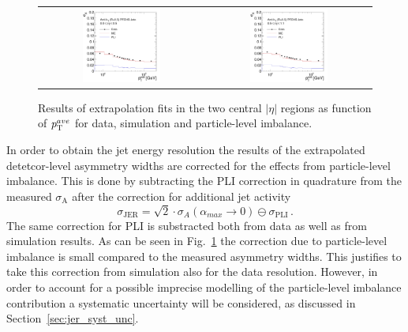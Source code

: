 \begin{figure}[!htp]
  \centering
  \begin{tabular}{cc}
                \includegraphics[width=0.49\textwidth]{figures/Extrapol_Eta0_final_nominal_v4.pdf} &
                \includegraphics[width=0.49\textwidth]{figures/Extrapol_Eta1_final_nominal_v4.pdf} \\
  \end{tabular}
  \caption{Results of extrapolation fits in the two central $|\eta|$ regions as function of $p_{\text{T}}^{ave}$ for data, simulation and particle-level imbalance.}
  \label{fig:fit-results}
\end{figure}

In order to obtain the jet energy resolution the results of the extrapolated detetcor-level asymmetry widths are corrected for the effects from particle-level imbalance. This is done by subtracting the PLI correction in quadrature from the measured $\sigma_\mathrm{A}$ after the correction for additional jet activity 
\begin{equation}
\sigma_\mathrm{JER} =  \sqrt{2} \cdot \sigma_{A}(\alpha_{max} \rightarrow 0) \ominus \sigma_\mathrm{PLI} \, .
\end{equation}  
The same correction for PLI is substracted both from data as well as from simulation results. As can be seen in Fig.~\ref{fig:fit-results} the correction due to particle-level imbalance is small compared to the measured asymmetry widths. This justifies to take this correction from simulation also for the data resolution. However, in order to account for a possible imprecise modelling of the particle-level imbalance contribution a systematic uncertainty will be considered, as discussed in Section~\ref{sec:jer_syst_unc}.

